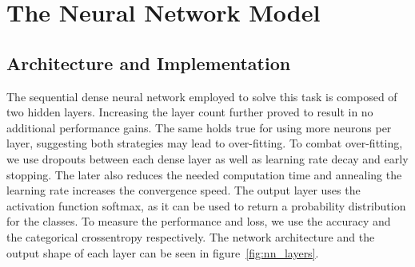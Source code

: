 \documentclass[
  12pt,
  bibliography=totoc,     %
  captions=tableheading,  %
  titlepage=firstiscover, %
]{scrartcl}
\begin{document}
\section{The Neural Network Model}
\subsection{Architecture and Implementation}
The sequential dense neural network employed to solve this task is composed of two hidden layers. Increasing the layer count further proved to result in no additional
performance gains. The same holds true for using more neurons per layer, suggesting both strategies may lead to over-fitting.
To combat over-fitting, we use dropouts between each dense layer as well as learning rate decay and early stopping.
The later also reduces the needed computation time and annealing the learning rate increases the convergence speed. The output layer uses the activation function softmax,
as it can be used to return a probability distribution for the classes. To measure the performance and loss, we use the accuracy and the categorical crossentropy respectively.
The network architecture and the output shape of each layer can be seen in figure~\ref{fig:nn_layers}.
\end{document}
